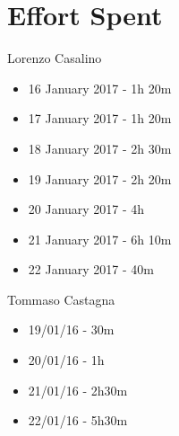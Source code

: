 \section{Effort Spent}

Lorenzo Casalino

\begin{itemize}
	\item 16 January 2017 - 1h 20m
	\item 17 January 2017 - 1h 20m
	\item 18 January 2017 - 2h 30m
	\item 19 January 2017 - 2h 20m
	\item 20 January 2017 - 4h
	\item 21 January 2017 - 6h 10m
	\item 22 January 2017 - 40m
\end{itemize}

Tommaso Castagna

\begin{itemize}
	\item 19/01/16 - 30m
	\item 20/01/16 - 1h
	\item 21/01/16 - 2h30m
	\item 22/01/16 - 5h30m
\end{itemize}
